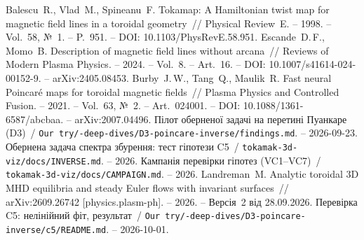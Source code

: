  Balescu~R., Vlad~M., Spineanu~F. Tokamap: A Hamiltonian twist map for magnetic field lines in a toroidal geometry~// Physical Review~E. -- 1998. -- Vol.~58, №~1. -- P.~951. -- DOI: 10.1103/PhysRevE.58.951.
 Escande~D.\,F., Momo~B. Description of magnetic field lines without arcana~// Reviews of Modern Plasma Physics. -- 2024. -- Vol.~8. -- Art.~16. -- DOI: 10.1007/s41614-024-00152-9. -- arXiv:2405.08453.
 Burby~J.\,W., Tang~Q., Maulik~R. Fast neural Poincaré maps for toroidal magnetic fields~// Plasma Physics and Controlled Fusion. -- 2021. -- Vol.~63, №~2. -- Art.~024001. -- DOI: 10.1088/1361-6587/abcbaa. -- arXiv:2007.04496.
 Пілот оберненої задачі на перетині Пуанкаре (D3)~/ \texttt{Our try/-deep-dives/\allowbreak D3-poincare-inverse/\allowbreak findings.md}. -- 2026-09-23.
 Обернена задача спектра збурення: тест гіпотези C5~/ \texttt{tokamak-3d-viz/docs/INVERSE.md}. -- 2026.
 Кампанія перевірки гіпотез (VC1--VC7)~/ \texttt{tokamak-3d-viz/docs/CAMPAIGN.md}. -- 2026.
 Landreman~M. Analytic toroidal 3D MHD equilibria and steady Euler flows with invariant surfaces~// arXiv:2609.26742 [physics.plasm-ph]. -- 2026. -- Версія~2 від 28.09.2026.
 Перевірка C5: нелінійний фіт, результат~/ \texttt{Our try/-deep-dives/\allowbreak D3-poincare-inverse/\allowbreak c5/README.md}. -- 2026-10-01.
